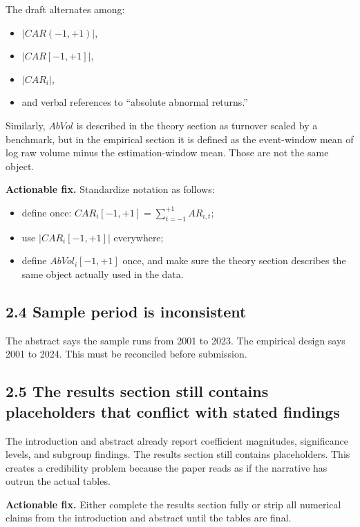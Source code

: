 \documentclass[11pt]{article}
\begin{document}
The draft alternates among:

\begin{itemize}[leftmargin=1.5em]
    \item $|CAR(-1,+1)|$,
    \item $|CAR[-1,+1]|$,
    \item $|CAR_i|$,
    \item and verbal references to ``absolute abnormal returns.''
\end{itemize}

Similarly, $AbVol$ is described in the theory section as turnover scaled by a benchmark, but in the empirical section it is defined as the event-window mean of log raw volume minus the estimation-window mean. Those are not the same object.

\textbf{Actionable fix.} Standardize notation as follows:

\begin{itemize}[leftmargin=1.5em]
    \item define once: $CAR_i[-1,+1]=\sum_{t=-1}^{+1}AR_{i,t}$;
    \item use $|CAR_i[-1,+1]|$ everywhere;
    \item define $AbVol_i[-1,+1]$ once, and make sure the theory section describes the same object actually used in the data.
\end{itemize}

\subsection*{2.4 Sample period is inconsistent}

The abstract says the sample runs from 2001 to 2023. The empirical design says 2001 to 2024. This must be reconciled before submission.

\subsection*{2.5 The results section still contains placeholders that conflict with stated findings}

The introduction and abstract already report coefficient magnitudes, significance levels, and subgroup findings. The results section still contains placeholders. This creates a credibility problem because the paper reads as if the narrative has outrun the actual tables.

\textbf{Actionable fix.} Either complete the results section fully or strip all numerical claims from the introduction and abstract until the tables are final.
\end{document}
